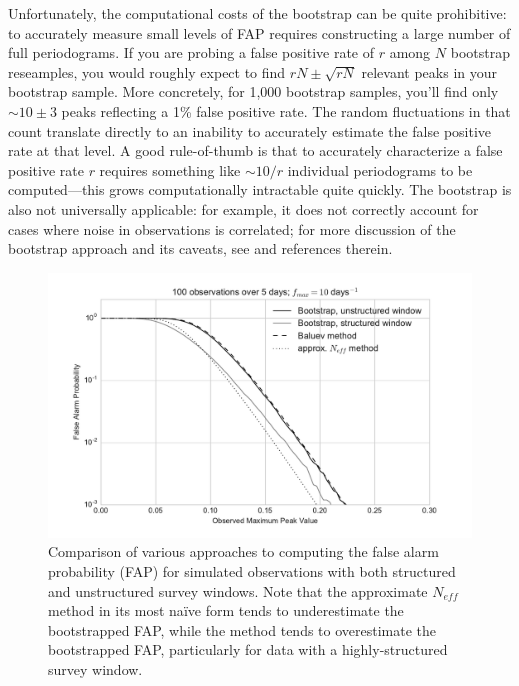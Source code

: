 \documentclass[preprint]{aastex}
\newcommand{\figlabel}[1]{\label{fig:#1}}
\begin{document}
Unfortunately, the computational costs of the bootstrap can be quite
prohibitive: to accurately measure small levels of FAP requires constructing
a large number of full periodograms.
If you are probing a false positive rate of $r$ among $N$ bootstrap reseamples,
you would roughly expect to find $rN \pm \sqrt{rN}$ relevant peaks in your
bootstrap sample.
More concretely, for 1,000 bootstrap samples, you'll find only $\sim 10\pm 3$
peaks reflecting a 1\% false positive rate.
The random fluctuations in that count translate directly to an inability to
accurately estimate the false positive rate at that level.
A good rule-of-thumb is that to accurately characterize a false positive rate
$r$ requires
something like $\sim 10 / r$ individual periodograms to be computed---this grows
computationally intractable quite quickly.
The bootstrap is also not universally applicable: for example, it does not
correctly account for cases where noise in observations is correlated;
for more discussion of the bootstrap approach and its caveats, see
\citet{ICVG2014} and references therein.

\begin{figure}[ht]
  \centering
  \includegraphics[width=\textwidth]{fig27_FAP_bootstrap}
  \caption{Comparison of various approaches to computing the false alarm
    probability (FAP) for simulated observations with both structured and
    unstructured survey windows. Note that the approximate $N_{eff}$ method
    in its most na{\"i}ve form tends to underestimate the bootstrapped FAP,
    while the \citet{Baluev2008} method tends to overestimate the bootstrapped
    FAP, particularly for data with a highly-structured survey window.
    \figlabel{FAP-bootstrap}}
\end{figure}
\end{document}
